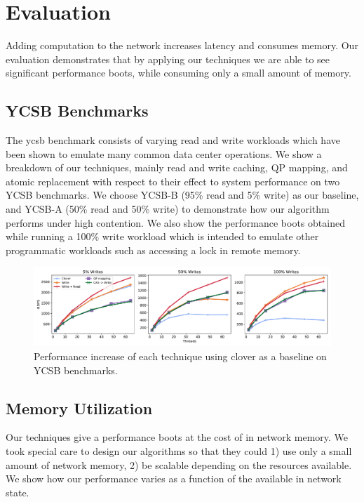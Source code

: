 \section{Evaluation}
\label{s:results}

Adding computation to the network increases latency and consumes memory. Our
evaluation demonstrates that by applying our techniques we are able to see
significant performance boots, while consuming only a small amount of memory.

\subsection{YCSB Benchmarks}

The ycsb benchmark consists of varying read and write workloads which have been
shown to emulate many common data center operations. We show a breakdown of our
techniques, mainly read and write caching, QP mapping, and atomic replacement
with respect to their effect to system performance on two YCSB benchmarks. We
choose YCSB-B (95\% read and 5\% write) as our baseline, and YCSB-A (50\% read and
50\% write) to demonstrate how our algorithm performs under high contention. We
also show the performance boots obtained while running a 100\% write workload
which is intended to emulate other programmatic workloads such as accessing a
lock in remote memory.

\begin{figure}
    \includegraphics[width=1.0\textwidth]{fig/full_system_performance.pdf}
    \caption{{Performance increase of each technique using clover as a baseline on YCSB benchmarks.}}
    \label{fig:full_system_performance}
\end{figure}


\subsection{Memory Utilization}

Our techniques give a performance boots at the cost of in network memory. We
took special care to design our algorithms so that they could 1) use only a
small amount of network memory, 2) be scalable depending on the resources
available. We show how our performance varies as a function of the available in
network state.

